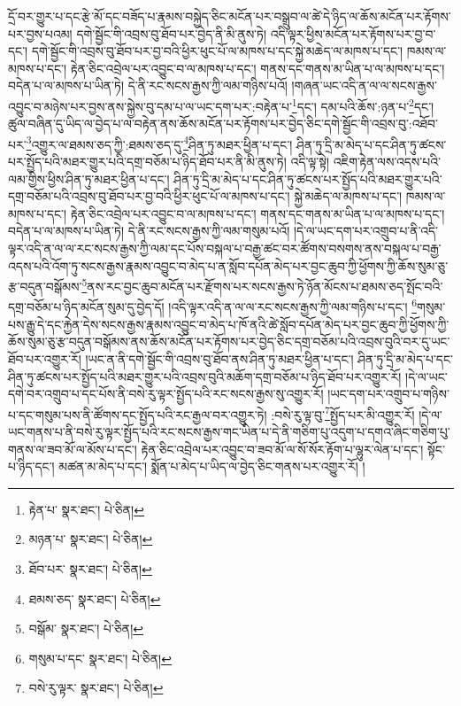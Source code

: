 དྲོ་བར་གྱུར་པ་དང་རྩེ་མོ་དང་བཟོད་པ་རྣམས་བསྐྱེད་ཅིང་མངོན་པར་བསྒྲུབ་ལ་ཚེ་དེ་ཉིད་ལ་ཆོས་མངོན་པར་རྟོགས་པར་བྱས་པའམ། དགེ་སྦྱོང་གི་འབྲས་བུ་ཐོབ་པར་བྱེད་ནི་མི་ནུས་ཏེ། འདི་ལྟར་ཕྱིས་མངོན་པར་རྟོགས་པར་བྱ་བ་དང་། དགེ་སྦྱོང་གི་འབྲས་བུ་ཐོབ་པར་བྱ་བའི་ཕྱིར་ཕུང་པོ་ལ་མཁས་པ་དང་སྐྱེ་མཆེད་ལ་མཁས་པ་དང་། ཁམས་ལ་མཁས་པ་དང་། རྟེན་ཅིང་འབྲེལ་པར་འབྱུང་བ་ལ་མཁས་པ་དང་། གནས་དང་གནས་མ་ཡིན་པ་ལ་མཁས་པ་དང་། བདེན་པ་ལ་མཁས་པ་ཡིན་ཏེ། དེ་ནི་རང་སངས་རྒྱས་ཀྱི་ལམ་གཉིས་པའོ། །གཞན་ཡང་འདི་ན་ལ་ལ་སངས་རྒྱས་འབྱུང་བ་མཉེས་པར་བྱས་ནས་སྐྱེས་བུ་དམ་པ་ལ་ཡང་དག་པར་:བརྟེན་པ་\footnote{རྟེན་པ་  སྣར་ཐང་།  པེ་ཅིན། }དང་། དམ་པའི་ཆོས་:ཉན་པ་\footnote{མཉན་པ་  སྣར་ཐང་།  པེ་ཅིན། }དང་། ཚུལ་བཞིན་དུ་ཡིད་ལ་བྱེད་པ་ལ་བརྟེན་ནས་ཆོས་མངོན་པར་རྟོགས་པར་བྱེད་ཅིང་དགེ་སྦྱོང་གི་འབྲས་བུ་:འཐོབ་པར་\footnote{ཐོབ་པར་  སྣར་ཐང་།  པེ་ཅིན། }འགྱུར་ལ་ཐམས་ཅད་ཀྱི་:ཐམས་ཅད་དུ་\footnote{ཐམས་ཅད་  སྣར་ཐང་།  པེ་ཅིན། }ཤིན་ཏུ་མཐར་ཕྱིན་པ་དང་། ཤིན་ཏུ་དྲི་མ་མེད་པ་དང་ཤིན་ཏུ་ཚངས་པར་སྤྱོད་པའི་མཐར་གྱུར་པའི་དགྲ་བཅོམ་པ་ཉིད་ཐོབ་པར་ནི་མི་ནུས་ཏེ། འདི་ལྟ་སྟེ། འཇིག་རྟེན་ལས་འདས་པའི་ལམ་གྱིས་ཕྱིས་ཤིན་ཏུ་མཐར་ཕྱིན་པ་དང་། ཤིན་ཏུ་དྲི་མ་མེད་པ་དང་ཤིན་ཏུ་ཚངས་པར་སྤྱོད་པའི་མཐར་གྱུར་པའི་དགྲ་བཅོམ་པའི་འབྲས་བུ་ཐོབ་པར་བྱ་བའི་ཕྱིར་ཕུང་པོ་ལ་མཁས་པ་དང་། སྐྱེ་མཆེད་ལ་མཁས་པ་དང་། ཁམས་ལ་མཁས་པ་དང་། རྟེན་ཅིང་འབྲེལ་པར་འབྱུང་བ་ལ་མཁས་པ་དང་། གནས་དང་གནས་མ་ཡིན་པ་ལ་མཁས་པ་དང་། བདེན་པ་ལ་མཁས་པ་ཡིན་ཏེ། དེ་ནི་རང་སངས་རྒྱས་ཀྱི་ལམ་གསུམ་པའོ། །དེ་ལ་ཡང་དག་པར་འགྲུབ་པ་ནི་འདི་ལྟར་འདི་ན་ལ་ལ་རང་སངས་རྒྱས་ཀྱི་ལམ་དང་པོས་བསྐལ་པ་བརྒྱ་ཚང་བར་ཚོགས་བསགས་ནས་བསྐལ་པ་བརྒྱ་འདས་པའི་འོག་ཏུ་སངས་རྒྱས་རྣམས་འབྱུང་བ་མེད་པ་ན་སློབ་དཔོན་མེད་པར་བྱང་ཆུབ་ཀྱི་ཕྱོགས་ཀྱི་ཆོས་སུམ་ཅུ་རྩ་བདུན་བསྒོམས་\footnote{བསྒོམ་  སྣར་ཐང་།  པེ་ཅིན། }ནས་རང་བྱང་ཆུབ་མངོན་པར་རྫོགས་པར་སངས་རྒྱས་ཏེ་ཉོན་མོངས་པ་ཐམས་ཅད་སྤོང་བའི་དགྲ་བཅོམ་པ་ཉིད་མངོན་སུམ་དུ་བྱེད་དོ། །འདི་ལྟར་འདི་ན་ལ་ལ་རང་སངས་རྒྱས་ཀྱི་ལམ་གཉིས་པ་དང་། \footnote{གསུམ་པ་དང་  སྣར་ཐང་།  པེ་ཅིན། }གསུམ་པས་རྒྱུ་དེ་དང་རྐྱེན་དེས་སངས་རྒྱས་རྣམས་འབྱུང་བ་མེད་པ་ཁོ་ནའི་ཚེ་སློབ་དཔོན་མེད་པར་བྱང་ཆུབ་ཀྱི་ཕྱོགས་ཀྱི་ཆོས་སུམ་ཅུ་རྩ་བདུན་བསྒོམས་ནས་ཆོས་མངོན་པར་རྟོགས་པར་བྱེད་ཅིང་དགྲ་བཅོམ་པའི་འབྲས་བུའི་བར་དུ་ཡང་ཐོབ་པར་འགྱུར་རོ། །ཡང་ན་ནི་དགེ་སྦྱོང་གི་འབྲས་བུ་ཐོབ་ནས་ཤིན་ཏུ་མཐར་ཕྱིན་པ་དང་། ཤིན་ཏུ་དྲི་མ་མེད་པ་དང་ཤིན་ཏུ་ཚངས་པར་སྤྱོད་པའི་མཐར་གྱུར་པའི་འབྲས་བུའི་མཆོག་དགྲ་བཅོམ་པ་ཉིད་ཐོབ་པར་འགྱུར་རོ། །དེ་ལ་ཡང་དགེ་བར་འགྲུབ་པ་དང་པོས་ནི་བསེ་རུ་ལྟར་སྤྱོད་པའི་རང་སངས་རྒྱས་སུ་འགྱུར་རོ། །ཡང་དག་པར་འགྲུབ་པ་གཉིས་པ་དང་གསུམ་པས་ནི་ཚོགས་དང་སྤྱོད་པའི་རང་རྒྱལ་བར་འགྱུར་ཏེ། :བསེ་རུ་ལྟ་བུ་\footnote{བསེ་རུ་ལྟར་  སྣར་ཐང་།  པེ་ཅིན། }སྤྱོད་པར་མི་འགྱུར་རོ། །དེ་ལ་ཡང་གནས་པ་ནི་བསེ་རུ་ལྟར་སྤྱོད་པའི་རང་སངས་རྒྱས་གང་ཡིན་པ་དེ་ནི་གཅིག་པུ་འདུག་པ་དགའ་ཞིང་གཅིག་པུ་གནས་ལ་ཟབ་མོ་ལ་མོས་པ་དང་། རྟེན་ཅིང་འབྲེལ་པར་འབྱུང་བ་ཟབ་མོ་ལ་སོ་སོར་རྟོག་པ་ལྷུར་ལེན་པ་དང་། སྟོང་པ་ཉིད་དང་། མཚན་མ་མེད་པ་དང་། སྨོན་པ་མེད་པ་ཡིད་ལ་བྱེད་ཅིང་གནས་པར་འགྱུར་རོ། །
